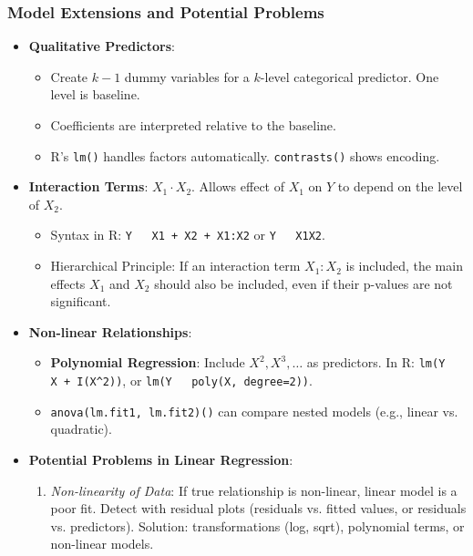 \documentclass[12pt,a4paper]{article}
\newcommand{\Rfunction}[1]{\texttt{#1()}} %
\newcommand{\Rcode}[1]{\texttt{#1}} %
\begin{document}
\begin{itemize}
    \subsubsection{Model Extensions and Potential Problems}
        \begin{itemize}
            \item \textbf{Qualitative Predictors}:
                \begin{itemize}
                    \item Create $k-1$ dummy variables for a $k$-level categorical predictor. One level is baseline.
                    \item Coefficients are interpreted relative to the baseline.
                    \item R's \Rfunction{lm} handles factors automatically. \Rfunction{contrasts} shows encoding.
                \end{itemize}
            \item \textbf{Interaction Terms}: $X_1 \cdot X_2$. Allows effect of $X_1$ on $Y$ to depend on the level of $X_2$.
                \begin{itemize}
                    \item Syntax in R: \Rcode{Y ~ X1 + X2 + X1:X2} or \Rcode{Y ~ X1X2}.
                    \item Hierarchical Principle: If an interaction term $X_1:X_2$ is included, the main effects $X_1$ and $X_2$ should also be included, even if their p-values are not significant.
                \end{itemize}
            \item \textbf{Non-linear Relationships}:
                \begin{itemize}
                    \item \textbf{Polynomial Regression}: Include $X^2, X^3, \dots$ as predictors.
                        In R: \Rcode{lm(Y ~ X + I(X^2))}, or \Rcode{lm(Y ~ poly(X, degree=2))}.
                    \item \Rfunction{anova(lm.fit1, lm.fit2)} can compare nested models (e.g., linear vs. quadratic).
                \end{itemize}
            \item \textbf{Potential Problems in Linear Regression}:
                \begin{enumerate}[label=\alph)]
                    \item \textit{Non-linearity of Data}: If true relationship is non-linear, linear model is a poor fit. Detect with residual plots (residuals vs. fitted values, or residuals vs. predictors). Solution: transformations (log, sqrt), polynomial terms, or non-linear models.

\end{enumerate}
\end{itemize}
\end{itemize}
\end{document}
